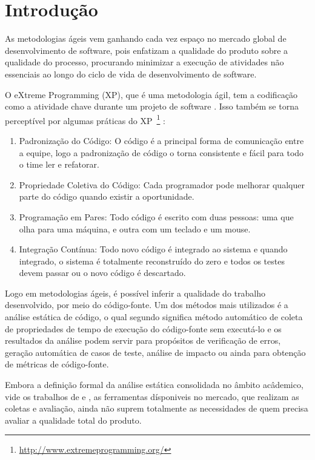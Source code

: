 \chapter{Introdução}

As metodologias ágeis vem ganhando cada vez espaço no mercado global 
de desenvolvimento de software, pois enfatizam a qualidade do produto 
sobre a qualidade do processo, procurando minimizar a execução 
de atividades não essenciais ao longo do ciclo de vida de 
desenvolvimento de software. 

O eXtreme Programming (XP), que é uma metodologia ágil, tem a codificação como a atividade chave durante um projeto de software \cite{beck1999}. Isso também se torna perceptível por algumas práticas do XP~\footnote{\url{http://www.extremeprogramming.org/}} :

\begin{enumerate}
\item Padronização do Código: O código é a principal forma de comunicação entre a equipe, logo a padronização de código o torna consistente e fácil para todo o time ler e refatorar. 
\item Propriedade Coletiva do Código: Cada programador pode melhorar qualquer parte do código quando existir a oportunidade.
\item Programação em Pares: Todo código é escrito com duas pessoas: uma que olha para uma máquina, e outra com um teclado e um mouse.
\item Integração Contínua: Todo novo código é integrado ao sistema e quando integrado, o sistema é totalmente reconstruído do zero e todos os testes devem passar ou o novo código é descartado.
\end{enumerate} 


Logo em metodologias ágeis, é possível inferir a qualidade do trabalho desenvolvido, por meio do código-fonte. Um dos métodos mais utilizados é a análise estática de código, o qual segundo  significa método automático de coleta de propriedades de tempo de execução do código-fonte sem executá-lo e os resultados da análise podem servir para propósitos de verificação de erros, geração automática de casos de teste, análise de impacto ou ainda para obtenção de métricas de código-fonte.

Embora a definição formal da análise estática consolidada no âmbito acâdemico, vide os trabalhos de \cite{Wichmann95} e \cite{Nielson:1999}, as ferramentas dísponiveis no mercado, que realizam as coletas e avaliação, ainda não suprem totalmente as necessidades de quem precisa avaliar a qualidade total do produto.

